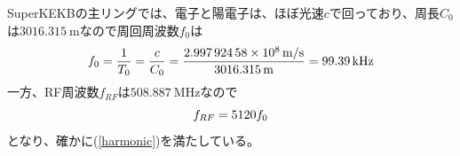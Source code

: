\documentclass[10pt,a4paper]{ltjsarticle}
\begin{document}
\vspace{\baselineskip}

\begin{tcolorbox}[title=\textgt{SuperKEKBにおける$f_{RF}$, $f_{0}$, $h$}の関係]
  SuperKEKBの主リングでは、電子と陽電子は、ほぼ光速$c$で回っており、周長$C_0$は$\SI{3016.315}{\meter}$なので周回周波数$f_0$は
  \begin{equation}
    f_0 = \frac{1}{T_0}=\frac{c}{C_0}=\frac{\SI{2.99792458e8}{\meter / \second}}{\SI{3016.315}{\meter}}=\SI{99.39}{\kilo\hertz} \notag
  \end{equation}
  一方、RF周波数$f_{RF}$は$\SI{508.887}{\mega\hertz}$なので
  \begin{equation}
      f_{RF} = 5120 f_0 \notag
  \end{equation}
  となり、確かに(\ref{harmonic})を満たしている。
\end{tcolorbox}
\end{document}
